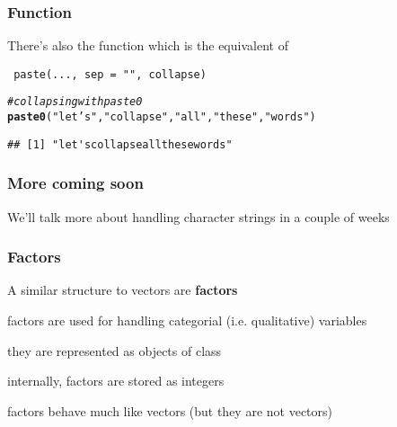 \documentclass[12pt]{beamer}\usepackage[]{graphicx}\usepackage[]{color}
\makeatletter
\newcommand{\hlstr}[1]{\textcolor[rgb]{0.192,0.494,0.8}{#1}}%
\newcommand{\hlcom}[1]{\textcolor[rgb]{0.678,0.584,0.686}{\textit{#1}}}%
\newcommand{\hlstd}[1]{\textcolor[rgb]{0.345,0.345,0.345}{#1}}%
\newcommand{\hlkwd}[1]{\textcolor[rgb]{0.737,0.353,0.396}{\textbf{#1}}}%
\newenvironment{kframe}{%
 \def\at@end@of@kframe{}%
 \ifinner\ifhmode%
  \def\at@end@of@kframe{\end{minipage}}%
  \begin{minipage}{\columnwidth}%
 \fi\fi%
 \def\FrameCommand##1{\hskip\@totalleftmargin \hskip-\fboxsep
 \colorbox{shadecolor}{##1}\hskip-\fboxsep
     \hskip-\linewidth \hskip-\@totalleftmargin \hskip\columnwidth}%
 \MakeFramed {\advance\hsize-\width
   \@totalleftmargin\z@ \linewidth\hsize
   \@setminipage}}%
 {\par\unskip\endMakeFramed%
 \at@end@of@kframe}
\newenvironment{knitrout}{}{} %
\makeatother
\begin{document}

\begin{frame}[fragile]
\frametitle{Function }

There's also the function  which is the equivalent of
\begin{verbatim}
 paste(..., sep = "", collapse)
\end{verbatim}

\begin{knitrout}\footnotesize
{}\color{fgcolor}\begin{kframe}
\begin{alltt}
\hlcom{# collapsing with paste0}
\hlkwd{paste0}\hlstd{(}\hlstr{"let's"}\hlstd{,} \hlstr{"collapse"}\hlstd{,} \hlstr{"all"}\hlstd{,} \hlstr{"these"}\hlstd{,} \hlstr{"words"}\hlstd{)}
\end{alltt}
\begin{verbatim}
## [1] "let'scollapseallthesewords"
\end{verbatim}
\end{kframe}
\end{knitrout}

\end{frame}


\begin{frame}
\frametitle{More coming soon}

{\large We'll talk more about handling character strings in a couple of weeks}

\end{frame}


\begin{frame}
\begin{center}
\Huge{}
\end{center}
\end{frame}


\begin{frame}
\frametitle{Factors}

\bi 
  \item A similar structure to vectors are \textbf{factors}
  \item factors are used for handling categorial (i.e. qualitative) variables
  \item they are represented as objects of class 
  \item internally, factors are stored as integers
  \item factors behave much like vectors (but they are not vectors)
\ei
\end{frame}
\end{document}
